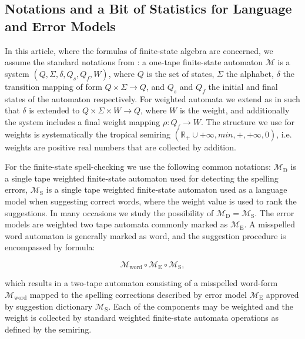 \documentclass[a4paper,12pt]{article}
\begin{document}
\subsection{Notations and a Bit of Statistics for Language and Error Models}
\label{subsec:theory}

In this article, where the formulas of finite-state algebra are concerned, we
assume the standard notations from \cite{aho2007compilers}: a one-tape
finite-state automaton $\mathcal{M}$ is a system $(Q, \Sigma, \delta, Q_s, Q_f,
W)$, where $Q$ is the set of states, $\Sigma$ the alphabet, $\delta$ the
transition mapping of form $Q \times \Sigma \rightarrow Q$, and $Q_s$ and $Q_f$
the initial and final states of the automaton respectively.  For weighted
automata we extend as in \cite{mohri2009weighted} such that $\delta$ is
extended to $Q \times \Sigma \times W \rightarrow Q$, where $W$ is the
weight, and additionally the system includes a final weight mapping $\rho: Q_f
\rightarrow W$. The structure we use for weights is systematically the tropical
semiring $(\mathbb{R}_+ \cup {+\infty}, min, +, +\infty, 0)$, i.e. weights are
positive real numbers that are collected by addition.

For the finite-state spell-checking we use the following common notations:
$\mathcal{M}_\mathrm{D}$ is a single tape weighted finite-state automaton used
for detecting the spelling errors, $\mathcal{M}_\mathrm{S}$ is a single tape
weighted finite-state automaton used as a language model when suggesting
correct words, where the weight value is used to rank the suggestions.  In many
occasions we study the possibility of $\mathcal{M}_\mathrm{D} =
\mathcal{M}_\mathrm{S}$. The error models are weighted two tape automata
commonly marked as $\mathcal{M}_\mathrm{E}$. A misspelled word automaton is
generally marked as $\mathcal{\mathrm{word}}$, and the suggestion procedure
is encompassed by formula:

\begin{equation}
    \label{formula:application}
    \mathcal{M}_{\mathrm{word}} \circ \mathcal{M}_{\mathrm{E}} \circ \mathcal{M}_{\mathrm{S}},
\end{equation}

which results in a two-tape automaton consisting of a misspelled word-form
$\mathcal{M}_{\mathrm{word}}$ mapped to the spelling corrections described by
error model $\mathcal{M}_\mathrm{E}$ approved by suggestion dictionary 
$\mathcal{M}_\mathrm{S}$. Each of the components may be weighted and the
weight is collected by standard weighted finite-state automata operations as
defined by the semiring.
\end{document}
